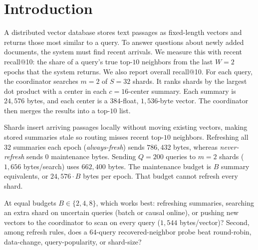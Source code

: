 \section{Introduction}
\label{sec:intro}

A distributed vector database stores text passages as fixed-length vectors and returns those most similar to a query. To answer questions about newly added documents, the system must find recent arrivals. We measure this with recent recall@10: the share of a query's true top-$10$ neighbors from the last $W = 2$ epochs that the system returns. We also report overall recall@10. For each query, the coordinator searches $m = 2$ of $S = 32$ shards. It ranks shards by the largest dot product with a center in each $c = 16$-center summary. Each summary is $24{,}576$ bytes, and each center is a $384$-float, $1{,}536$-byte vector. The coordinator then merges the results into a top-$10$ list.

Shards insert arriving passages locally without moving existing vectors, making stored summaries stale so routing misses recent top-$10$ neighbors. Refreshing all $32$ summaries each epoch (\emph{always-fresh}) sends $786{,}432$ bytes, whereas \emph{never-refresh} sends $0$ maintenance bytes. Sending $Q = 200$ queries to $m = 2$ shards ($1{,}656$ bytes/search) uses $662{,}400$ bytes. The maintenance budget is $B$ summary equivalents, or $24{,}576 \cdot B$ bytes per epoch. That budget cannot refresh every shard.

At equal budgets $B \in \{2, 4, 8\}$, which works best: refreshing summaries, searching an extra shard on uncertain queries (batch or causal online), or pushing new vectors to the coordinator to scan on every query ($1{,}544$ bytes/vector)? Second, among refresh rules, does a $64$-query recovered-neighbor probe beat round-robin, data-change, query-popularity, or shard-size?

